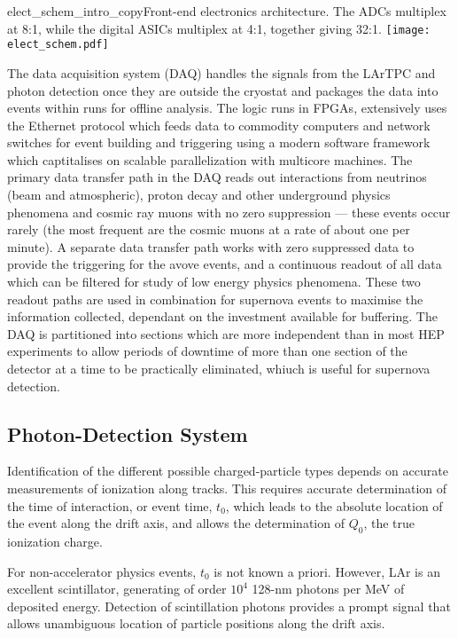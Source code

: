 \begin{cdrfigure}{elect_schem_intro_copy}{Front-end electronics architecture. The ADCs multiplex at 8:1, while the digital ASICs multiplex at 4:1, together giving 32:1.}
\texttt{[image: elect\_schem.pdf]}
\end{cdrfigure}

The data acquisition system (DAQ) handles the signals from the LArTPC and photon detection once they are outside the cryostat and packages the data into events within runs for offline analysis.  The logic runs in FPGAs, extensively uses the Ethernet protocol which feeds data to commodity computers and network switches  for event building and triggering using a modern software framework which captitalises on scalable parallelization with multicore machines. The primary data transfer path in the DAQ reads out interactions from neutrinos (beam and atmospheric), proton decay and other underground physics phenomena and cosmic ray muons with no zero suppression --- these events occur rarely (the most frequent are the cosmic muons at a rate of about one per minute).  A separate data transfer path works with zero suppressed data to provide the triggering for the avove events, and a continuous readout of all data which can be filtered for study of low energy physics phenomena.  These two readout paths are used in combination for supernova events to maximise the information collected, dependant on the investment available for buffering.  The DAQ is partitioned into sections which are more independent than in most HEP experiments to allow periods of downtime of more than one section of the detector at a time to be practically eliminated, whiuch is useful for supernova detection.

\subsection{Photon-Detection System}

Identification of the different possible charged-particle types 
depends on accurate measurements of ionization along tracks. This requires accurate determination
of the time of interaction, or event time, $t_0$, which leads to the absolute location 
of the event along the drift axis, and allows the determination of $Q_0$,  the 
true ionization charge.

For non-accelerator physics events, $t_0$ is not known a priori.  
However, LAr is an excellent scintillator, generating of 
order $10^{4}$ 128-nm photons per MeV of deposited energy.  
Detection of scintillation photons 
provides a prompt signal that allows unambiguous 
location of particle positions along the drift axis.

